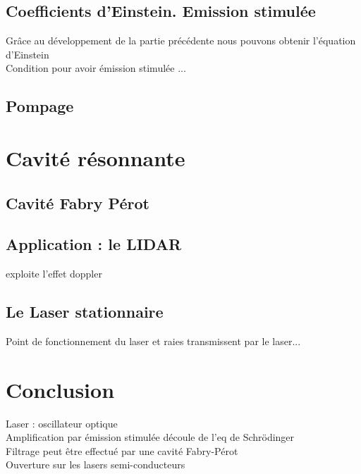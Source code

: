 \subsection{Coefficients d’Einstein. Emission stimulée}
Grâce au développement de la partie précédente nous pouvons obtenir l’équation d’Einstein \\
Condition pour avoir émission stimulée ...
\subsection{Pompage}
\section{Cavité résonnante}
\subsection{Cavité Fabry Pérot}
\subsection{Application : le LIDAR}
exploite l’effet doppler
\subsection{Le Laser stationnaire}
Point de fonctionnement du laser et raies transmissent par le laser...

\section*{Conclusion}
Laser : oscillateur optique \\
Amplification par émission stimulée découle de l’eq de Schrödinger \\
Filtrage peut être effectué par une cavité Fabry-Pérot \\
Ouverture sur les lasers semi-conducteurs \\


